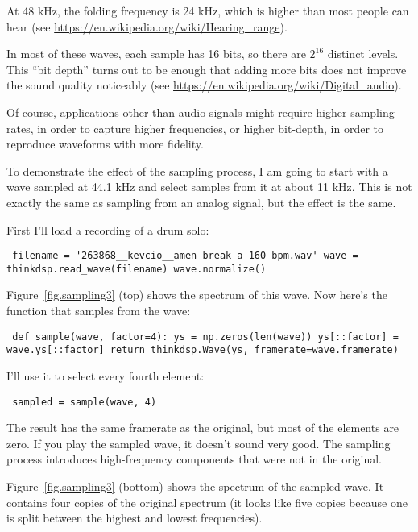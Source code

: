 \documentclass[12pt]{book} \usepackage[width=5.5in,height=8.5in, hmarginratio=3:2,vmarginratio=1:1]{geometry}
\begin{document}
At 48 kHz, the folding frequency is 24 kHz, which is higher than most people can hear (see \url{https://en.wikipedia.org/wiki/Hearing_range}). 

In most of these waves, each sample has 16 bits, so there are $2^{16}$ distinct levels. This ``bit depth'' turns out to be enough that adding more bits does not improve the sound quality noticeably (see \url{https://en.wikipedia.org/wiki/Digital_audio}). 

Of course, applications other than audio signals might require higher sampling rates, in order to capture higher frequencies, or higher bit-depth, in order to reproduce waveforms with more fidelity. 

To demonstrate the effect of the sampling process, I am going to start with a wave sampled at 44.1 kHz and select samples from it at about 11 kHz. This is not exactly the same as sampling from an analog signal, but the effect is the same. 

First I'll load a recording of a drum solo: 

\begin{verbatim} filename = '263868__kevcio__amen-break-a-160-bpm.wav' wave = thinkdsp.read_wave(filename) wave.normalize() \end{verbatim} 

Figure~\ref{fig.sampling3} (top) shows the spectrum of this wave. Now here's the function that samples from the wave: 

\begin{verbatim} def sample(wave, factor=4): ys = np.zeros(len(wave)) ys[::factor] = wave.ys[::factor] return thinkdsp.Wave(ys, framerate=wave.framerate) \end{verbatim} 

I'll use it to select every fourth element: 

\begin{verbatim} sampled = sample(wave, 4) \end{verbatim} 

The result has the same framerate as the original, but most of the elements are zero. If you play the sampled wave, it doesn't sound very good. The sampling process introduces high-frequency components that were not in the original. 

Figure~\ref{fig.sampling3} (bottom) shows the spectrum of the sampled wave. It contains four copies of the original spectrum (it looks like five copies because one is split between the highest and lowest frequencies). 
\end{document}
